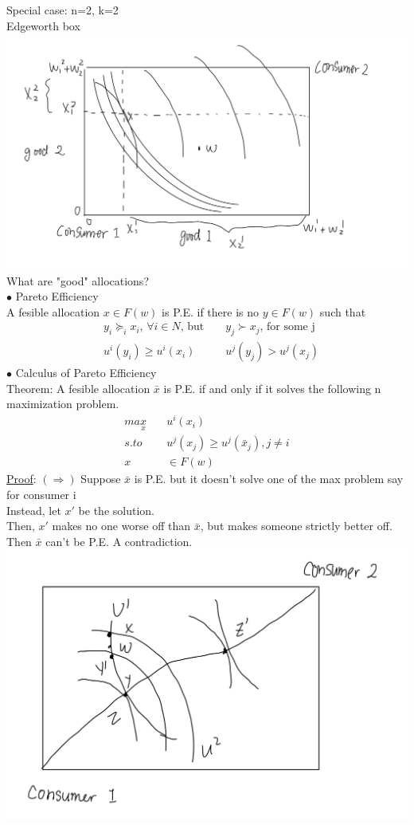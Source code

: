 \documentclass[letterpaper,13pt,single,pdftex]{scrartcl}
\begin{document}
Special case: n=2, k=2\\
Edgeworth box\\
\includegraphics[scale = 0.19]{edgeworth_box.jpg}\\
What are "good" allocations?\\
$\bullet$ Pareto Efficiency\\
A fesible allocation $x \in F(w)$ is P.E. if there is no $y\in F(w)$ such that 
\begin{align*}
    &y_i\succeq_i x_i, \, \forall i \in N\text{, but }& &y_j\succ x_j\text{, for some j}\\
    &u^i(y_i) \ge u^i(x_i) & &u^j(y_j) > u^j(x_j)
\end{align*}
$\bullet$ Calculus of Pareto Efficiency\\
Theorem: A fesible allocation $\bar{x}$ is P.E. if and only  if it solves the following n maximization problem. 
\begin{align*}
    max\limits_x\quad &u^i (x_i)\\
    s.to \quad &u^j(x_j) \ge u^j(\bar{x}_j), j\ne i\\
    x &\in F(w)
\end{align*}
\underline{Proof}: $(\Rightarrow)$ Suppose $\bar{x}$ is P.E. but it doesn't solve one of the max problem say for consumer i\\
Instead, let $x'$ be the solution. \\
Then, $x'$ makes no one worse off than $\bar{x}$, but makes someone strictly better off. Then $\bar{x}$ can't be P.E. A contradiction. \\
\includegraphics[scale = 0.2]{pareto-efficiency.jpg}\\
\end{document}
